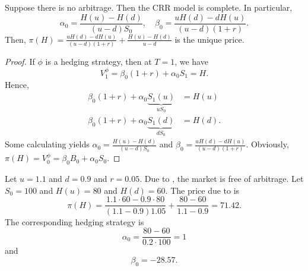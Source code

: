 \documentclass[12pt]{amsart}
\begin{document}
\begin{theorem}\label{th:CRR_COMPLETE}
    Suppose there is no arbitrage. Then the CRR model is complete. In particular, \[
        \alpha_0 = \frac{H(u) - H(d)}{(u-d)S_0}, \quad \beta_0 = \frac{uH(d) - dH(u)}{(u-d)(1+r)}.
    \]
    Then, \(\pi(H) = \frac{uH(d) - dH(u)}{(u-d)(1+r)} + \frac{H(u)-H(d)}{u-d}\) is the unique price.
\end{theorem}
\begin{proof}
    If \(\phi\) is a hedging strategy, then at \(T=1\), we have \[
        V_1^\phi = \beta_0(1+r) + \alpha_0 S_1 = H.
    \]
    Hence, \begin{align*}
        \beta_0(1+r) + \alpha_0 \underbrace{S_1(u)}_{uS_0} &= H(u)\\
        \beta_0 (1+r) + \alpha_0 \underbrace{S_1(d)}_{dS_0} &= H(d).
    \end{align*}
    Some calculating yields \(\alpha_0=\frac{H(u)-H(d)}{(u-d)S_0}\) and \(\beta_0=\frac{uH(d)-dH(u)}{(u-d)(1+r)}\). Obviously, \(\pi(H)=V_0^\phi=\beta_0B_0+\alpha_0S_0\).
\end{proof}

\begin{example}
    Let \(u=1.1\) and \(d=0.9\) and \(r=0.05\). Due to , the market is free of arbitrage. Let \(S_0 = 100\) and \(H(u)=80\) and \(H(d)=60\). The price due to  is \[
        \pi(H) = \frac{1.1 \cdot 60 - 0.9 \cdot 80}{(1.1 - 0.9) 1.05} + \frac{80-60}{1.1-0.9} = 71.42.
    \]
    The corresponding hedging strategy is \[
        \alpha_0 = \frac{80-60}{0.2 \cdot 100} = 1
    \]
    and \[
        \beta_0 = -28.57.
    \]
\end{example}
\end{document}
